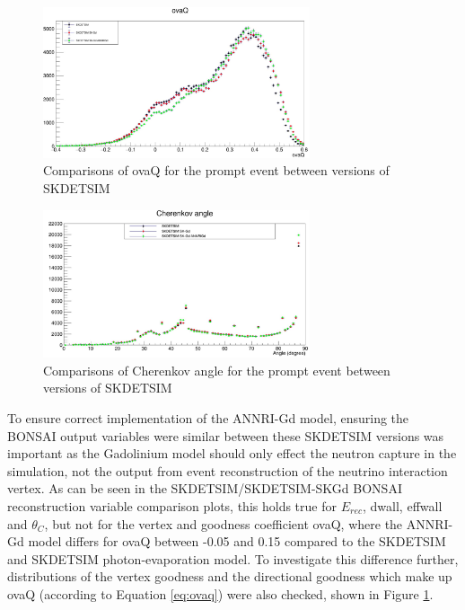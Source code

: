 \begin{figure}
    \centering
    \includegraphics[width=0.7\textwidth]{Figures/ovaQ_compare.png}
    \caption{Comparisons of ovaQ for the prompt event between versions of SKDETSIM }
    \label{fig:ovaQ_compare}

\end{figure}

\begin{figure}
    \centering
    \includegraphics[width=0.7\textwidth]{Figures/thetaC_compare.png}
    \caption{Comparisons of Cherenkov angle for the prompt event between versions of SKDETSIM}
    \label{fig:thetaC_compare}

\end{figure}


To ensure correct implementation of the ANNRI-Gd model, ensuring the BONSAI output variables were similar between these SKDETSIM versions was important as the Gadolinium model should only effect the neutron capture in the simulation, not the output from event reconstruction of the neutrino interaction vertex. As can be seen in the SKDETSIM/SKDETSIM-SKGd BONSAI reconstruction variable comparison plots, this holds true for $E_{rec}$, dwall, effwall and $\theta_C$, but not for the vertex and goodness coefficient ovaQ, where the ANNRI-Gd model differs for ovaQ between -0.05 and 0.15 compared to the SKDETSIM and SKDETSIM photon-evaporation model. To investigate this difference further, distributions of the vertex goodness and the directional goodness which make up ovaQ (according to Equation \ref{eq:ovaq}) were also checked, shown in Figure \ref{fig:ovaQ_compare}.



